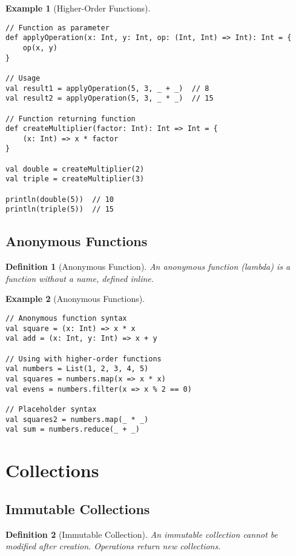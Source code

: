 \documentclass[11pt]{article}
\newtheorem{definition}{Definition}[section]
\newtheorem{example}{Example}[section]
\begin{document}
\begin{example}[Higher-Order Functions]
\begin{lstlisting}
// Function as parameter
def applyOperation(x: Int, y: Int, op: (Int, Int) => Int): Int = {
    op(x, y)
}

// Usage
val result1 = applyOperation(5, 3, _ + _)  // 8
val result2 = applyOperation(5, 3, _ * _)  // 15

// Function returning function
def createMultiplier(factor: Int): Int => Int = {
    (x: Int) => x * factor
}

val double = createMultiplier(2)
val triple = createMultiplier(3)

println(double(5))  // 10
println(triple(5))  // 15
\end{lstlisting}
\end{example}

\subsection{Anonymous Functions}

\begin{definition}[Anonymous Function]
An anonymous function (lambda) is a function without a name, defined inline.
\end{definition}

\begin{example}[Anonymous Functions]
\begin{lstlisting}
// Anonymous function syntax
val square = (x: Int) => x * x
val add = (x: Int, y: Int) => x + y

// Using with higher-order functions
val numbers = List(1, 2, 3, 4, 5)
val squares = numbers.map(x => x * x)
val evens = numbers.filter(x => x % 2 == 0)

// Placeholder syntax
val squares2 = numbers.map(_ * _)
val sum = numbers.reduce(_ + _)
\end{lstlisting}
\end{example}

\section{Collections}

\subsection{Immutable Collections}

\begin{definition}[Immutable Collection]
An immutable collection cannot be modified after creation. Operations return new collections.
\end{definition}
\end{document}
